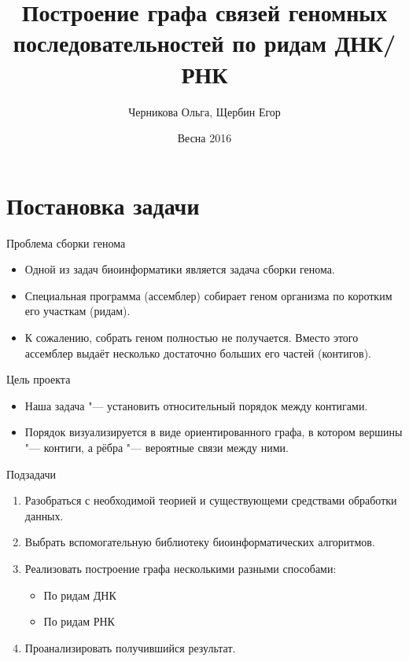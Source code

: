 \documentclass{beamer}
\title[Граф по ридам ДНК/РНК]{Построение графа связей геномных последовательностей по ридам ДНК/РНК}
\author{Черникова Ольга, Щербин Егор}
\institute[СПб АУ РАН]{Руководитель: Пржибельский Андрей \\ СПб АУ РАН }
\date{Весна 2016}
\newcommand{\cimg}[2]{%
	\begin{center}%
		\ifthenelse{\equal{#2}{}}{%
			\texttt{[image: \#1]}
		}{%
			\texttt{[image: \#1]}
		}%
	\end{center}%
}
\begin{document}
\begin{frame}
	\titlepage
\end{frame}

\section{Постановка задачи}

\begin{frame}[t]{Проблема сборки генома}
    \begin{itemize}
    \item
        Одной из задач биоинформатики является задача сборки генома.
    \item
        Специальная программа (ассемблер) собирает геном организма по коротким
        его участкам (ридам).
    \item
        К сожалению, собрать геном полностью не получается. Вместо этого
        ассемблер выдаёт несколько достаточно больших его частей (контигов).
    \end{itemize}
\end{frame}

\begin{frame}[t]{Цель проекта}
    \begin{itemize}
    \item
        Наша задача "--- установить относительный порядок между контигами.
    \item
        Порядок визуализируется в виде ориентированного
        графа, в котором вершины "--- контиги, а рёбра "--- вероятные связи
        между ними.
    \end{itemize}

    \cimg{1.jpg}{1}

\end{frame}

\begin{frame}[t]{Подзадачи}
	\begin{enumerate}
    \item
        Разобраться с необходимой теорией и существующеми средствами обработки
        данных.
    \item
        Выбрать вспомогательную библиотеку биоинформатических алгоритмов.
    \item
        Реализовать построение графа несколькими разными способами:
        
        \begin{itemize}
        \item
            По ридам ДНК
        \item
            По ридам РНК
        \end{itemize}
    \item
        Проанализировать получившийся результат.
	\end{enumerate}
\end{frame}
\end{document}
